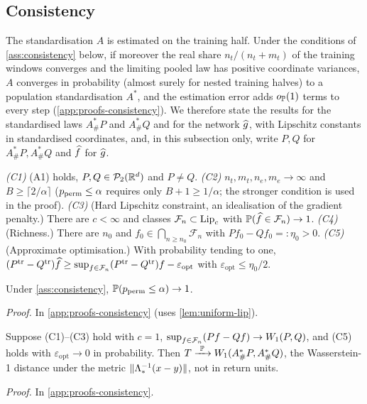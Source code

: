 \subsection{Consistency}\label{sec:theory-consistency}

The standardisation $A$ is estimated on the training half. Under the conditions of
\cref{ass:consistency} below, if moreover the real share $n_t/(n_t+m_t)$ of the training windows
converges and the limiting pooled law has positive coordinate variances, $A$ converges in
probability (almost surely for nested training halves) to a population standardisation $A^*$, and
the estimation error adds $o_{\mathbb{P}}(1)$ terms to every step (\cref{app:proofs-consistency}).
We therefore state the results for the standardised laws $A^*_\#P$ and $A^*_\#Q$ and for the
network $\widehat{g}$, with Lipschitz constants in standardised coordinates, and, in this subsection
only, write $P,Q$ for $A^*_\#P,A^*_\#Q$ and $\widehat{f}$ for $\widehat{g}$.

\begin{assumption}\label{ass:consistency}
\emph{(C1)} (A1) holds, $P,Q\in\mathcal{P}_{2}(\mathbb{R}^d)$ and $P\neq Q$.
\emph{(C2)} $n_t,m_t,n_e,m_e\to\infty$ and $B\ge\lceil2/\alpha\rceil$ ($p_{\mathrm{perm}}\le\alpha$ requires
only $B+1\ge1/\alpha$; the stronger condition is used in the proof).
\emph{(C3)} (Hard Lipschitz constraint, an idealisation of the gradient penalty.) There are
$c<\infty$ and classes $\mathcal F_n\subset\operatorname{Lip}_c$ with $\mathbb{P}(\widehat{f}\in\mathcal F_n)\to1$.
\emph{(C4)} (Richness.) There are $n_0$ and $f_0\in\bigcap_{n\ge n_0}\mathcal F_n$ with
$Pf_0-Qf_0=:\eta_0>0$.
\emph{(C5)} (Approximate optimisation.) With probability tending to one,
$(P^{\mathrm{tr}}-Q^{\mathrm{tr}})\widehat{f}\ge\sup_{f\in\mathcal F_n}(P^{\mathrm{tr}}-Q^{\mathrm{tr}})f-\varepsilon_{\mathrm{opt}}$ with
$\varepsilon_{\mathrm{opt}}\le\eta_0/2$.
\end{assumption}

\begin{proposition}\label{prop:consistency}
Under \cref{ass:consistency}, $\mathbb{P}(p_{\mathrm{perm}}\le\alpha)\to1$.
\end{proposition}
\noindent\textit{Proof.} In \cref{app:proofs-consistency} (uses \cref{lem:uniform-lip}).

\begin{corollary}
\label{cor:w1-limit}
Suppose (C1)--(C3) hold with $c=1$, $\sup_{f\in\mathcal F_n}(Pf-Qf)\to W_{1}(P,Q)$, and (C5) holds
with $\varepsilon_{\mathrm{opt}}\to0$ in probability. Then $T\xrightarrow{\ \mathbb{P}\ }W_{1}(A^*_\#P,A^*_\#Q)$, the
Wasserstein-1 distance under the metric $\lVert\Lambda_*^{-1}(x-y)\rVert$, not in return units.
\end{corollary}
\noindent\textit{Proof.} In \cref{app:proofs-consistency}.

